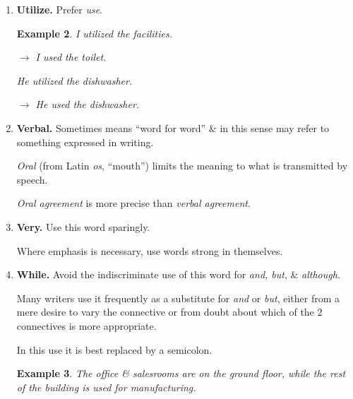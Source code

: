 \documentclass{article}
\newtheorem{example}{Example}
\begin{document}
\begin{enumerate}
	Hence, there can be no degrees of uniqueness.
	\begin{example}
		It was the most unique coffee maker on the market.
		
		$\to$ It was a unique coffee maker.
		
		The balancing act was very unique.
		
		$\to$ The balancing act was unique.
		
		Of all the spiders, the one that lives in a bubble under water is the most unique.
		
		$\to$ Among spiders, the one that lives in a bubble under water is unique.
	\end{example}
	\item {\bf Utilize.} Prefer {\it use}.
	\begin{example}
		I utilized the facilities.
		
		$\to$ I used the toilet.
		
		He utilized the dishwasher.
		
		$\to$ He used the dishwasher.
	\end{example}
	\item {\bf Verbal.} Sometimes means ``word for word'' \& in this sense may refer to something expressed in writing.
	
	{\it Oral} (from Latin {\it os}, ``mouth'') limits the meaning to what is transmitted by speech.
	
	{\it Oral agreement} is more precise than {\it verbal agreement}.
	\item {\bf Very.} Use this word sparingly.
	
	Where emphasis is necessary, use words strong in themselves.
	\item {\bf While.} Avoid the indiscriminate use of this word for {\it and, but}, \& {\it although}.
	
	Many writers use it frequently as a substitute for {\it and} or {\it but}, either from a mere desire to vary the connective or from doubt about which of the 2 connectives is more appropriate.
	
	In this use it is best replaced by a semicolon.
	\begin{example}
		The office \& salesrooms are on the ground floor, while the rest of the building is used for manufacturing.
		

\end{example}
\end{enumerate}
\end{document}
